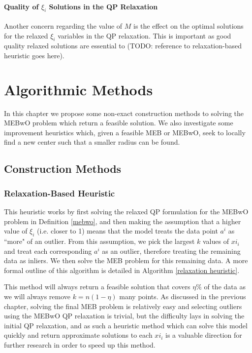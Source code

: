 \documentclass[11pt,twoside]{report}
\theoremstyle{definition}
\numberwithin{theorem}{section}
\numberwithin{definition}{section}
\numberwithin{lemma}{section}
\numberwithin{proposition}{section}
\numberwithin{equation}{section}
\begin{document}
\subsubsection{Quality of $\xi_i$ Solutions in the QP Relaxation}
Another concern regarding the value of $M$ is the effect on the optimal solutions for the relaxed $\xi_i$ variables in the QP relaxation. This is important as good quality relaxed solutions are essential to (TODO: reference to relaxation-based heuristic goes here).



\chapter{Algorithmic Methods}
In this chapter we propose some non-exact construction methods to solving the MEBwO problem which return a feasible solution. We also investigate some improvement heuristics which, given a feasible MEB or MEBwO, seek to locally find a new center such that a smaller radius can be found.

\section{Construction Methods}
\subsection{Relaxation-Based Heuristic}
This heuristic works by first solving the relaxed QP formulation for the MEBwO problem in Definition \ref{mebwo}, and then making the assumption that a higher value of $\xi_i$ (i.e. closer to 1) means that the model treats the data point $a^i$ as ``more" of an outlier. From this assumption, we pick the largest $k$ values of $xi_i$ and treat each corresponding $a^i$ as an outlier, therefore treating the remaining data as inliers. We then solve the MEB problem for this remaining data. A more formal outline of this algorithm is detailed in Algorithm \ref{relaxation heuristic}.

This method will always return a feasible solution that covers $\eta\%$ of the data as we will always remove $k=n(1-\eta)$ many points. As discussed in the previous chapter, solving the final MEB problem is relatively easy and selecting outliers using the MEBwO QP relaxation is trivial, but the difficulty lays in solving the initial QP relaxation, and as such a heuristic method which can solve this model quickly and return approximate solutions to each $xi_i$ is a valuable direction for further research in order to speed up this method.
\end{document}
